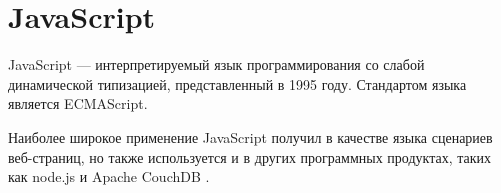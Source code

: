 %
%
%
%
%
%
%
%
%
%
%
%
%
%
%
%
%
%
%
%
%
%
%
%
%
%
%
%
%
%
%
%
%
%
%
% 
%
%





\section{JavaScript}

JavaScript \cite{js} --- интерпретируемый язык программирования со слабой динамической типизацией, представленный в 1995 году. Стандартом языка является ECMAScript. \cite{ecmascript}

Наиболее широкое применение JavaScript получил в качестве языка сценариев веб-страниц, но также используется и в других программных продуктах, таких как node.js \cite{node_js} и Apache CouchDB \cite{couchdb}.



